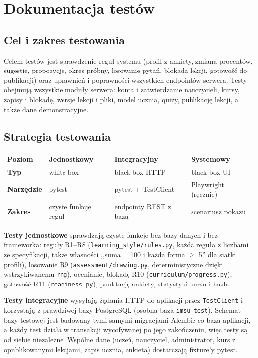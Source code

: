 \section{Dokumentacja testów}

\subsection{Cel i zakres testowania}

Celem testów jest sprawdzenie reguł systemu (profil z ankiety, zmiana procentów, sugestie, propozycje, okres próbny, losowanie pytań, blokada lekcji, gotowość do publikacji) oraz uprawnień i poprawności wszystkich endpointów serwera. Testy obejmują wszystkie moduły serwera: konta i zatwierdzanie nauczycieli, kursy, zapisy i blokadę, wersje lekcji i pliki, model ucznia, quizy, publikację lekcji, a także dane demonstracyjne.

\subsection{Strategia testowania}

\begin{center}
\small
\begin{tabular}{llll}
\toprule
\textbf{Poziom} & Jednostkowy & Integracyjny & Systemowy \\
\midrule
\textbf{Typ} & white-box & black-box HTTP & black-box UI \\
\textbf{Narzędzie} & pytest & pytest + TestClient & Playwright (ręcznie) \\
\textbf{Zakres} & czyste funkcje reguł & endpointy REST z bazą & scenariusz pokazu \\
\bottomrule
\end{tabular}
\end{center}

\bigskip

\textbf{Testy jednostkowe} sprawdzają czyste funkcje bez bazy danych i bez frameworka: reguły R1--R8 (\nolinkurl{learning_style/rules.py}, każda reguła z liczbami ze specyfikacji, także własności ,,suma = 100 i każda forma $\geq$ 5'' dla siatki profili), losowanie R9 (\nolinkurl{assessment/drawing.py}, deterministyczne dzięki wstrzykiwanemu \texttt{rng}), ocenianie, blokadę R10 (\nolinkurl{curriculum/progress.py}), gotowość R11 (\texttt{readiness.py}), punktację ankiety, statystyki kursu i hasła.

\textbf{Testy integracyjne} wysyłają żądania HTTP do aplikacji przez \texttt{TestClient} i korzystają z prawdziwej bazy PostgreSQL (osobna baza \texttt{imsu\_test}). Schemat bazy testowej jest budowany tymi samymi migracjami Alembic co baza aplikacji, a każdy test działa w transakcji wycofywanej po jego zakończeniu, więc testy są od siebie niezależne. Wspólne dane (uczeń, nauczyciel, administrator, kurs z opublikowanymi lekcjami, zapis ucznia, ankieta) dostarczają fixture'y pytest.

